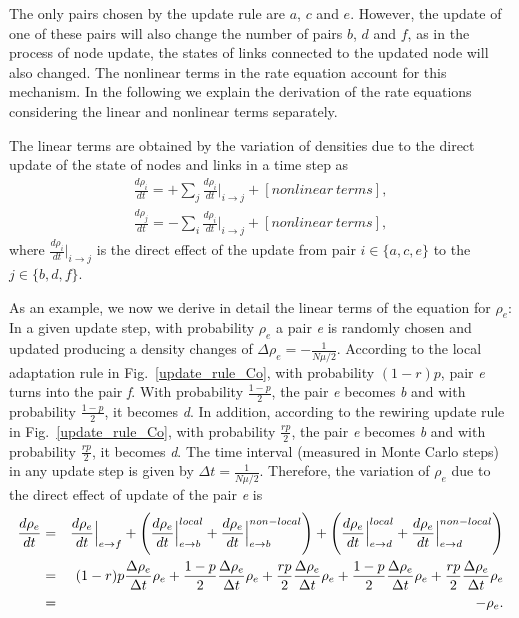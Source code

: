 \documentclass[aps,pre,notitlepage]{revtex4-1}
\begin{document}
The only pairs chosen by the update rule are $a$, $c$ and $e$. However, the update of one of these pairs will also change the number of pairs $b$, $d$ and $f$, as in the process of node update, the states of links connected to the updated node will also changed. The nonlinear terms in the rate equation account for this mechanism. In the following we explain the derivation of the rate equations considering the linear and nonlinear terms separately.

The linear terms are obtained by the variation of densities due to the direct update of the state of nodes and links in a time step as
\begin{eqnarray}
\frac{d\rho_i}{dt}=+\sum_{j}\frac{d\rho_i}{dt}\Big\rvert_{i\rightarrow j}+[nonlinear \ terms], \label{deriv_i} \\
\frac{d\rho_j}{dt}=-\sum_{i}\frac{d\rho_i}{dt}\Big\rvert_{i\rightarrow j}+[nonlinear \ terms], \label{deriv_j}
\end{eqnarray}
where $\frac{d\rho_i}{dt}\Big\rvert_{i\rightarrow j}$ is the direct effect of the update from pair $i\in \{a,c,e\}$ to the $j\in \{b,d,f\}$.

As an example, we now we derive in detail the linear terms of the equation for $\rho_{e}$: In a given update step, with probability $\rho_{e}$ a pair \textit{e} is randomly chosen and updated producing a density changes of $\Delta\rho_e=-\frac{1}{N\mu/2}$. According to the local adaptation rule in Fig.~\ref{update_rule_Co}, with probability $(1-r)p$, pair \textit{e} turns into the pair \textit{f}. With probability $\frac{1-p}{2}$, the pair \textit{e} becomes \textit{b} and with probability $\frac{1-p}{2}$, it becomes \textit{d}. In addition, according to the rewiring update rule in Fig.~\ref{update_rule_Co}, with probability $\frac{rp}{2}$, the pair \textit{e} becomes \textit{b} and with probability $\frac{rp}{2}$, it becomes \textit{d}. The time interval (measured in Monte Carlo steps) in any update step is given by $\Delta t=\frac{1}{N\mu/2}$. Therefore, the variation of $\rho_{e}$ due to the direct effect of update of the pair \textit{e} is
\begin{eqnarray}
\frac{d\rho_e}{dt}&=&\frac{d\rho_e}{dt}\Big\rvert_{e\rightarrow f}+\Bigg(\frac{d\rho_e}{dt}\Big\rvert_{e\rightarrow b}^{local}+\frac{d\rho_e}{dt}\Big\rvert_{e\rightarrow b}^{non-local}\Bigg)+\Bigg(\frac{d\rho_e}{dt}\Big\rvert_{e\rightarrow d}^{local}+\frac{d\rho_e}{dt}\Big\rvert_{e\rightarrow d}^{non-local}\Bigg) \cr
&=&(1-r)p\frac{\Delta\rho_e}{\Delta t}\rho_e+\frac{1-p}{2}\frac{\Delta\rho_e}{\Delta t}\rho_e+\frac{rp}{2}\frac{\Delta\rho_e}{\Delta t}\rho_e+\frac{1-p}{2}\frac{\Delta\rho_e}{\Delta t}\rho_e+\frac{rp}{2}\frac{\Delta\rho_e}{\Delta t}\rho_e \cr
&=&-\rho_{e}.
\label{deriv_exa}
\end{eqnarray}
\end{document}
